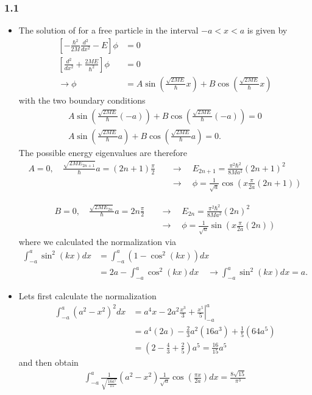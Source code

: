 \documentclass[10pt,a4paper]{article}
\theoremstyle{definition}
\begin{document}
\subsubsection{1.1}
\begin{itemize}
\item The solution of for a free particle in the interval $-a<x<a$ is given by
\begin{align}
    \left[-\frac{\hbar^2}{2M}\frac{d^2}{dx^2}-E\right]\phi&=0\\
    \left[\frac{d^2}{dx^2}+\frac{2ME}{\hbar^2}\right]\phi&=0\\
    \rightarrow\phi&=A\sin\left(\frac{\sqrt{2ME}}{\hbar}x\right)+B\cos\left(\frac{\sqrt{2ME}}{\hbar}x\right)
\end{align}    
with the two boundary conditions
\begin{align} 
A\sin\left(\frac{\sqrt{2ME}}{\hbar}(-a)\right)+B\cos\left(\frac{\sqrt{2ME}}{\hbar}(-a)\right)=0\\
A\sin\left(\frac{\sqrt{2ME}}{\hbar}a\right)+B\cos\left(\frac{\sqrt{2ME}}{\hbar}a\right)=0.
\end{align}
The possible energy eigenvalues are therefore
\begin{align}
    A=0,\quad\frac{\sqrt{2ME_{2n+1}}}{\hbar}a=(2n+1)\frac{\pi}{2}
    &\quad\rightarrow\quad E_{2n+1}=\frac{\pi^2\hbar^2}{8Ma^2}(2n+1)^2\\
    &\quad\rightarrow\quad
    \phi=\frac{1}{\sqrt{a}}\cos\left(x\frac{\pi}{2a}(2n+1)\right)
\end{align}   
    
\begin{align}    
    B=0,\quad\frac{\sqrt{2ME_{2n}}}{\hbar}a=2n\frac{\pi}{2}
    &\quad\rightarrow\quad E_{2n}=\frac{\pi^2\hbar^2}{8Ma^2}(2n)^2\\
    &\quad\rightarrow\quad
    \phi=\frac{1}{\sqrt{a}}\sin\left(x\frac{\pi}{2a}(2n)\right)
\end{align}
where we calculated the normalization via
\begin{align}
    \int_{-a}^a\sin^2(kx)dx
    &=\int_{-a}^a(1-\cos^2(kx))dx\\
    &=2a-\int_{-a}^a\cos^2(kx)dx\quad\rightarrow\int_{-a}^a\sin^2(kx)dx=a.
\end{align}

\item Lets first calculate the normalization
\begin{align}
    \int_{-a}^a(a^2-x^2)^2dx
    &=\left.a^4x-2a^2\frac{x^3}{3}+\frac{x^5}{5}\right|_{-a}^a\\
    &=a^4(2a)-\frac{2}{3}a^2(16a^3)+\frac{1}{5}(64a^5)\\
    &=\left(2-\frac{4}{3}+\frac{2}{5}\right)a^5=\frac{16}{15}a^5
\end{align}
and then obtain
\begin{align}
    \int_{-a}^a \frac{1}{\sqrt{\frac{16a^5}{15}}} \left(a^2-x^2\right)\frac{1}{\sqrt{a}} \cos \left(\frac{\pi  x}{2 a}\right)dx=\frac{8\sqrt{15}}{\pi^3}
\end{align}
\end{itemize}
\end{document}
